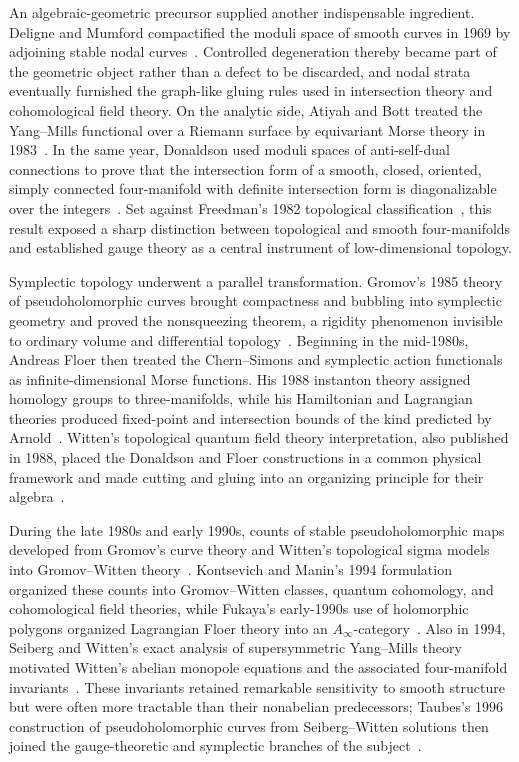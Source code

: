 \documentclass[11pt,letterpaper,twoside]{article}
\theoremstyle{plain}
\theoremstyle{definition}
\theoremstyle{remark}
\let\cite\citep
\newcommand{\Ainf}{A_\infty}
\begin{document}
An algebraic-geometric precursor supplied another indispensable ingredient.  Deligne and Mumford compactified the moduli space of smooth curves in 1969 by adjoining stable nodal curves~\cite{delignemumford1969}.  Controlled degeneration thereby became part of the geometric object rather than a defect to be discarded, and nodal strata eventually furnished the graph-like gluing rules used in intersection theory and cohomological field theory.  On the analytic side, Atiyah and Bott treated the Yang--Mills functional over a Riemann surface by equivariant Morse theory in 1983~\cite{atiyahbott1983}.  In the same year, Donaldson used moduli spaces of anti-self-dual connections to prove that the intersection form of a smooth, closed, oriented, simply connected four-manifold with definite intersection form is diagonalizable over the integers~\cite{donaldson1983}.  Set against Freedman's 1982 topological classification~\cite{freedman1982}, this result exposed a sharp distinction between topological and smooth four-manifolds and established gauge theory as a central instrument of low-dimensional topology.

Symplectic topology underwent a parallel transformation.  Gromov's 1985 theory of pseudoholomorphic curves brought compactness and bubbling into symplectic geometry and proved the nonsqueezing theorem, a rigidity phenomenon invisible to ordinary volume and differential topology~\cite{gromov1985}.  Beginning in the mid-1980s, Andreas Floer then treated the Chern--Simons and symplectic action functionals as infinite-dimensional Morse functions.  His 1988 instanton theory assigned homology groups to three-manifolds, while his Hamiltonian and Lagrangian theories produced fixed-point and intersection bounds of the kind predicted by Arnold~\cite{floer1988instanton,floer1988}.  Witten's topological quantum field theory interpretation, also published in 1988, placed the Donaldson and Floer constructions in a common physical framework and made cutting and gluing into an organizing principle for their algebra~\cite{witten1988}.

During the late 1980s and early 1990s, counts of stable pseudoholomorphic maps developed from Gromov's curve theory and Witten's topological sigma models into Gromov--Witten theory~\cite{witten1988sigma}.  Kontsevich and Manin's 1994 formulation organized these counts into Gromov--Witten classes, quantum cohomology, and cohomological field theories, while Fukaya's early-1990s use of holomorphic polygons organized Lagrangian Floer theory into an \(\Ainf\)-category~\cite{kontsevichmanin1994,fukaya1993}.  Also in 1994, Seiberg and Witten's exact analysis of supersymmetric Yang--Mills theory motivated Witten's abelian monopole equations and the associated four-manifold invariants~\cite{seibergwitten1994,witten1994}.  These invariants retained remarkable sensitivity to smooth structure but were often more tractable than their nonabelian predecessors; Taubes's 1996 construction of pseudoholomorphic curves from Seiberg--Witten solutions then joined the gauge-theoretic and symplectic branches of the subject~\cite{taubes1996}.
\end{document}
